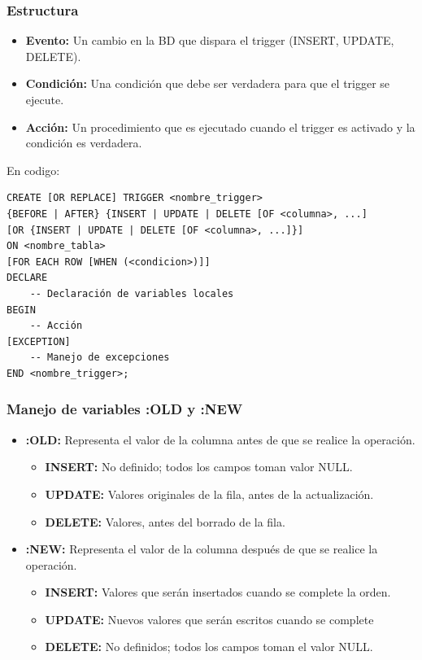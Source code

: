 \documentclass{templateNote}
\begin{document}
\subsubsection{Estructura}
\begin{itemize}
    \item \textbf{Evento:} Un cambio en la BD que dispara el trigger (INSERT, UPDATE, DELETE).
    \item \textbf{Condición:} Una condición que debe ser verdadera para que el trigger se ejecute.
    \item \textbf{Acción:} Un procedimiento que es ejecutado cuando el trigger es activado y la condición es verdadera.
\end{itemize}
En codigo:
\begin{tcolorbox}[
    colframe=Morado!100, %
    colback=Morado!20,       %
    coltitle=white!100, %
    title=\textbf{PL/SQL}, %
]
    \begin{verbatim}
CREATE [OR REPLACE] TRIGGER <nombre_trigger>
{BEFORE | AFTER} {INSERT | UPDATE | DELETE [OF <columna>, ...]
[OR {INSERT | UPDATE | DELETE [OF <columna>, ...]}]
ON <nombre_tabla>
[FOR EACH ROW [WHEN (<condicion>)]]
DECLARE
    -- Declaración de variables locales
BEGIN
    -- Acción
[EXCEPTION]
    -- Manejo de excepciones
END <nombre_trigger>;
    \end{verbatim}
\end{tcolorbox}

\subsubsection{Manejo de variables :OLD y :NEW}
\begin{itemize}
    \item \textbf{:OLD:} Representa el valor de la columna antes de que se realice la operación.
    \begin{itemize}
        \item \textbf{INSERT:} No definido; todos los campos toman valor NULL.
        \item \textbf{UPDATE:} Valores originales de la fila, antes de la actualización.
        \item \textbf{DELETE:} Valores, antes del borrado de la fila.
    \end{itemize}
    \item \textbf{:NEW:} Representa el valor de la columna después de que se realice la operación.
    \begin{itemize}
        \item \textbf{INSERT:} Valores que serán insertados cuando se complete la orden.
        \item \textbf{UPDATE:} Nuevos valores que serán escritos cuando se complete 
        \item \textbf{DELETE:} No definidos; todos los campos toman el valor NULL.
    \end{itemize}
\end{itemize}
\end{document}

